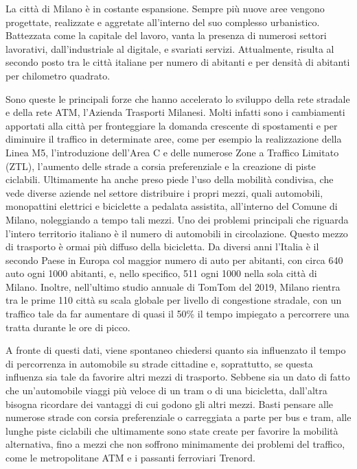 La città di Milano è in costante espansione. Sempre più nuove aree vengono progettate, realizzate e aggretate all'interno del suo complesso urbanistico. Battezzata come la capitale del lavoro, vanta la presenza di numerosi settori lavorativi, dall'industriale al digitale, e svariati servizi. Attualmente, risulta al secondo posto tra le città italiane per numero di abitanti e per densità di abitanti per chilometro quadrato.

Sono queste le principali forze che hanno accelerato lo sviluppo della rete stradale e della rete ATM, l'Azienda Trasporti Milanesi. Molti infatti sono i cambiamenti apportati alla città per fronteggiare la domanda crescente di spostamenti e per diminuire il traffico in determinate aree, come per esempio la realizzazione della Linea M5, l'introduzione dell'Area C e delle numerose Zone a Traffico Limitato (ZTL), l'aumento delle strade a corsia preferenziale e la creazione di piste ciclabili. Ultimamente ha anche preso piede l'uso della mobilità condivisa, che vede diverse aziende nel settore distribuire i propri mezzi, quali automobili, monopattini elettrici e biciclette a pedalata assistita, all'interno del Comune di Milano, noleggiando a tempo tali mezzi. Uno dei problemi principali che riguarda l'intero territorio italiano è il numero di automobili in circolazione. Questo mezzo di trasporto è ormai più diffuso della bicicletta. Da diversi anni l'Italia è il secondo Paese in Europa col maggior numero di auto per abitanti, con circa 640 auto ogni 1000 abitanti\cite{eurostatcars}, e, nello specifico, 511 ogni 1000 nella sola città di Milano. Inoltre, nell'ultimo studio annuale di TomTom del 2019\cite{tomtomindexmilan}, Milano rientra tra le prime 110 città su scala globale per livello di congestione stradale, con un traffico tale da far aumentare di quasi il 50\% il tempo impiegato a percorrere una tratta durante le ore di picco.

A fronte di questi dati, viene spontaneo chiedersi quanto sia influenzato il tempo di percorrenza in automobile su strade cittadine e, soprattutto, se questa influenza sia tale da favorire altri mezzi di trasporto. Sebbene sia un dato di fatto che un'automobile viaggi più veloce di un tram o di una bicicletta, dall'altra bisogna ricordare dei vantaggi di cui godono gli altri mezzi. Basti pensare alle numerose strade con corsia preferenziale o carreggiata a parte per bus e tram, alle lunghe piste ciclabili che ultimamente sono state create per favorire la mobilità alternativa, fino a mezzi che non soffrono minimamente dei problemi del traffico, come le metropolitane ATM e i passanti ferroviari Trenord.

